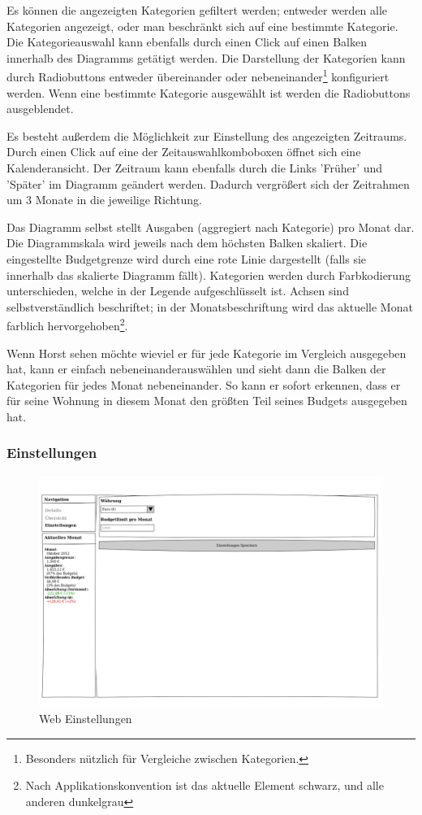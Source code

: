 Es können die angezeigten Kategorien gefiltert werden; entweder werden alle
Kategorien angezeigt, oder man beschränkt sich auf eine bestimmte Kategorie.
Die Kategorieauswahl kann ebenfalls durch einen Click auf einen Balken
innerhalb des Diagramms getätigt werden. Die Darstellung der Kategorien kann
durch Radiobuttons entweder übereinander oder nebeneinander\footnote{Besonders
nützlich für Vergleiche zwischen Kategorien.} konfiguriert werden.  Wenn eine
bestimmte Kategorie ausgewählt ist werden die Radiobuttons ausgeblendet.

Es besteht außerdem die Möglichkeit zur Einstellung des angezeigten Zeitraums.
Durch einen Click auf eine der Zeitauswahlkomboboxen öffnet sich eine
Kalenderansicht. Der Zeitraum kann ebenfalls durch die Links 'Früher' und
'Später' im Diagramm geändert werden. Dadurch vergrößert sich der Zeitrahmen um
3 Monate in die jeweilige Richtung.

Das Diagramm selbst stellt Ausgaben (aggregiert nach Kategorie) pro Monat dar.
Die Diagrammskala wird jeweils nach dem höchsten Balken skaliert.  Die
eingestellte Budgetgrenze wird durch eine rote Linie dargestellt (falls sie
innerhalb das skalierte Diagramm fällt). Kategorien werden durch Farbkodierung
unterschieden, welche in der Legende aufgeschlüsselt ist. Achsen sind
selbstverständlich beschriftet; in der Monatsbeschriftung wird das aktuelle
Monat farblich hervorgehoben\footnote{Nach Applikationskonvention ist das
aktuelle Element schwarz, und alle anderen dunkelgrau}.

Wenn Horst sehen m\"ochte wieviel er f\"ur jede Kategorie im Vergleich
ausgegeben hat, kann er einfach \glqq nebeneinander\grqq\space ausw\"ahlen und sieht
dann die Balken der Kategorien f\"ur jedes Monat nebeneinander. So kann er
sofort erkennen, dass er f\"ur seine Wohnung in diesem Monat den gr\"o\ss ten
Teil seines Budgets ausgegeben hat.

\subsubsection{Einstellungen}

\begin{figure}[htl]
\centering
\includegraphics[width=\textwidth]{img/web_settings}
\caption{Web Einstellungen}
\label{fig:web_settings}
\end{figure}

